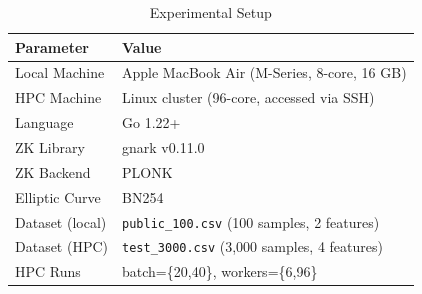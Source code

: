 \begin{table}[H]
\centering
\caption{Experimental Setup}
\label{tab:exp_setup}
\begin{tabular}{|l|l|}
\hline
\textbf{Parameter} & \textbf{Value} \\
\hline
Local Machine  & Apple MacBook Air (M-Series, 8-core, 16 GB) \\
HPC Machine    & Linux cluster (96-core, accessed via SSH) \\
Language       & Go 1.22+ \\
ZK Library     & gnark v0.11.0 \\
ZK Backend     & PLONK \\
Elliptic Curve & BN254 \\
Dataset (local) & \texttt{public\_100.csv} (100 samples, 2 features) \\
Dataset (HPC)   & \texttt{test\_3000.csv} (3,000 samples, 4 features) \\
HPC Runs       & batch=\{20,40\}, workers=\{6,96\} \\
\hline
\end{tabular}
\end{table}
